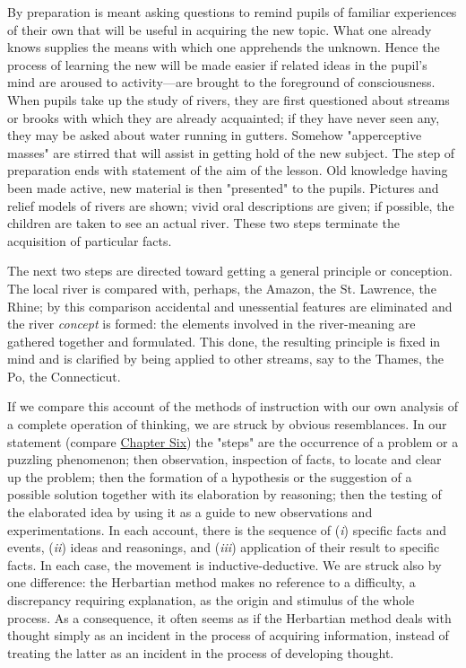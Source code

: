 \documentclass[showtrims,ustradepaper]{memoir}
\begin{document}
By preparation is meant asking questions to remind pupils of familiar
experiences of their own that will be useful in acquiring the new topic.
What one already knows supplies the means with which one apprehends the
unknown. Hence the process of learning the new will be made easier if
related ideas in the pupil's mind are aroused to activity---are brought
to the foreground of consciousness. When pupils take up the study of
rivers, they are first questioned about streams or
brooks
with which they are already acquainted; if they have never seen any,
they may be asked about water running in gutters. Somehow "apperceptive
masses" are stirred that will assist in getting hold of the new subject.
The step of preparation ends with statement of the aim of the lesson.
Old knowledge having been made active, new material is then "presented"
to the pupils. Pictures and relief models of rivers are shown; vivid
oral descriptions are given; if possible, the children are taken to see
an actual river. These two steps terminate the acquisition of particular
facts.

The next two steps are directed toward getting a general principle or
conception. The local river is compared with, perhaps, the Amazon, the
St. Lawrence, the Rhine; by this comparison accidental and unessential
features are eliminated and the river \emph{concept} is formed: the
elements involved in the river-meaning are gathered together and
formulated. This done, the resulting principle is fixed in mind and is
clarified by being applied to other streams, say to the Thames, the Po,
the Connecticut.


If we compare this account of the methods of instruction with our own
analysis of a complete operation of thinking, we are struck by obvious
resemblances. In our statement (compare
\protect\hyperlink{ux40publicux40vhostux40gux40gutenbergux40htmlux40filesux4037423ux4037423-hux4037423-h-2.htm.htmlux5cux23CHAPTER_SIX}{Chapter
Six}) the "steps" are the occurrence of a problem or a puzzling
phenomenon; then observation, inspection of facts, to locate and clear
up the problem; then the formation of a hypothesis or the suggestion of
a possible solution together with its elaboration by reasoning; then the
testing of the elaborated idea by using it as a guide to new
observations and experimentations. In each account, there is the
sequence of (\emph{i}) specific facts
and
events, (\emph{ii}) ideas and reasonings, and (\emph{iii}) application
of their result to specific facts. In each case, the movement is
inductive-deductive. We are struck also by one difference: the
Herbartian method makes no reference to a difficulty, a discrepancy
requiring explanation, as the origin and stimulus of the whole process.
As a consequence, it often seems as if the Herbartian method deals with
thought simply as an incident in the process of acquiring information,
instead of treating the latter as an incident in the process of
developing thought.
\end{document}
